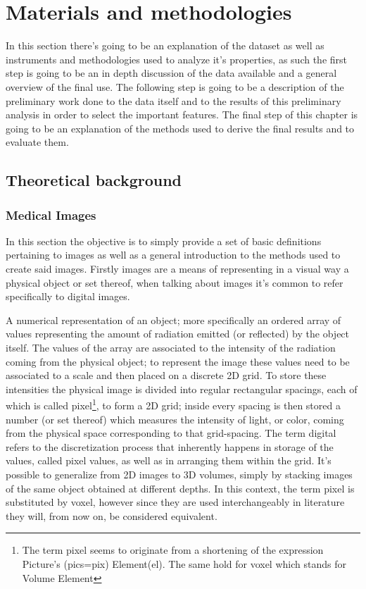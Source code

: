 \chapter{Materials and methodologies}\label{cap: Material_method}
In this section there's going to be an explanation of the dataset as well as instruments and methodologies used to analyze it's properties, as such the first step is going to be an in depth discussion of the data available and a general overview of the final use. The following step is going to be a description of the preliminary work done to the data itself and to the results of this preliminary analysis in order to select the important features. The final step of this chapter is going to be an explanation of the methods used to derive the final results and to evaluate them.

\section{Theoretical background}
\subsection{Medical Images}
In this section the objective is to simply provide a set of basic definitions pertaining to images as well as a general introduction to the methods used to create said images. Firstly images are a means of representing in a visual way a physical object or set thereof, when talking about images it's common to refer specifically to digital images.

\begin{definition}
A numerical representation of an object; more specifically an ordered array of values representing the amount of radiation emitted (or reflected) by the object itself. The values of the array are associated to the intensity of the radiation coming from the physical object; to represent the image these values need to be associated to a scale and then placed on a discrete 2D grid. 
To store these intensities the physical image is divided into regular rectangular spacings, each of which is called pixel\footnote{The term pixel seems to originate from a shortening of the expression Picture's (pics=pix) Element(el). The same hold for voxel which stands for Volume Element}, to form a 2D grid; inside every spacing is then stored a number (or set thereof) which measures the intensity of light, or color, coming from the physical space corresponding to that grid-spacing. 
The term digital refers to the discretization process that inherently happens in storage of the values, called pixel values, as well as in arranging them within the grid. It's possible to generalize from 2D images to 3D volumes, simply by stacking images of the same object obtained at different depths. In this context, the term pixel is substituted by voxel, however since they are used interchangeably in literature they will, from now on, be considered equivalent.
\end{definition}

